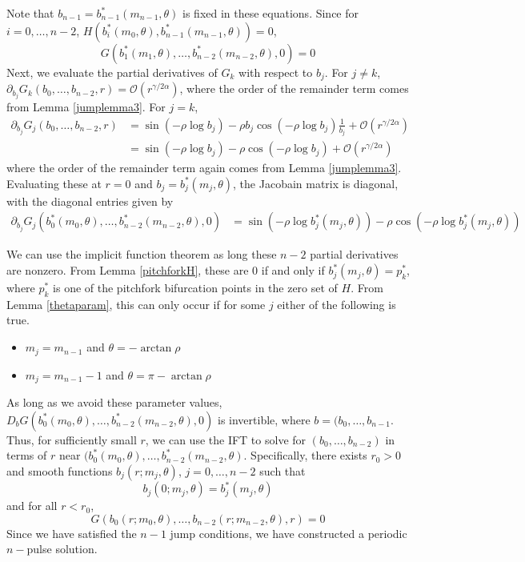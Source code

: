 \documentclass[thesis.tex]{subfiles}
\begin{document}
Note that $b_{n-1} = b_{n-1}^*(m_{n-1}, \theta)$ is fixed in these equations. Since for $i = 0, \dots, n-2$, $H(b_i^*(m_0, \theta), b_{n-1}^*(m_{n-1}, \theta)) = 0$, 
\[
G(b_1^*(m_1, \theta), \dots, b_{n-2}^*(m_{n-2}, \theta), 0) = 0
\]
Next, we evaluate the partial derivatives of $G_k$ with respect to $b_j$. For $j \neq k$, $\partial_{b_j} G_k(b_0, \dots, b_{n-2}, r) = \mathcal{O}(r^{\gamma/2\alpha})$, where the order of the remainder term comes from Lemma \ref{jumplemma3}. For $j = k$, 
\begin{align*}
\partial_{b_j} G_j(b_0, \dots, b_{n-2}, r) &= 
\sin \left( -\rho \log b_j \right) - \rho b_j \cos \left( -\rho \log b_j \right) \frac{1}{b_j} + \mathcal{O}(r^{\gamma/2\alpha}) \\
&= \sin \left( -\rho \log b_j \right) - \rho \cos \left( -\rho \log b_j \right) + \mathcal{O}(r^{\gamma/2\alpha}) 
\end{align*}
where the order of the remainder term again comes from Lemma \eqref{jumplemma3}. Evaluating these at $r = 0$ and $b_j = b_j^*(m_j, \theta)$, the Jacobain matrix is diagonal, with the diagonal entries given by 
\begin{align*}
\partial_{b_j} G_j(b_0^*(m_0, \theta), \dots, b_{n-2}^*(m_{n-2}, \theta), 0)
&= \sin \left( -\rho \log b_j^*(m_j, \theta) \right) - \rho \cos \left( -\rho \log b_j^*(m_j, \theta) \right)
\end{align*}

We can use the implicit function theorem as long these $n-2$ partial derivatives are nonzero. From Lemma \ref{pitchforkH}, these are 0 if and only if $b_j^*(m_j, \theta) = p_k^*$, where $p_k^*$ is one of the pitchfork bifurcation points in the zero set of $H$. From Lemma \ref{thetaparam}, this can only occur if for some $j$ either of the following is true.
\begin{itemize}
\item $m_j = m_{n-1}$ and $\theta = -\arctan \rho$
\item $m_j = m_{n-1} - 1$ and $\theta = \pi-\arctan \rho$
\end{itemize}

As long as we avoid these parameter values, $D_b G(b_0^*(m_0, \theta), \dots, b_{n-2}^*(m_{n-2}, \theta), 0)$ is invertible, where $b = (b_0, \dots, b_{n-1}$. Thus, for sufficiently small $r$, we can use the IFT to solve for $(b_0,\dots,b_{n-2})$ in terms of $r$ near $(b_0^*(m_0, \theta), \dots, b_{n-2}^*(m_{n-2}, \theta)$. Specifically, there exists $r_0 > 0$ and smooth functions $b_j(r; m_j, \theta)$, $j = 0, \dots, n-2$ such that
\[
b_j(0; m_j, \theta) = b_j^*(m_j, \theta)
\]
and for all $r < r_0$, 
\[
G(b_0(r; m_0, \theta), \dots, b_{n-2}(r; m_{n-2}, \theta), r) = 0
\]
Since we have satisfied the $n-1$ jump conditions, we have constructed a periodic $n-$pulse solution. 
\end{document}
